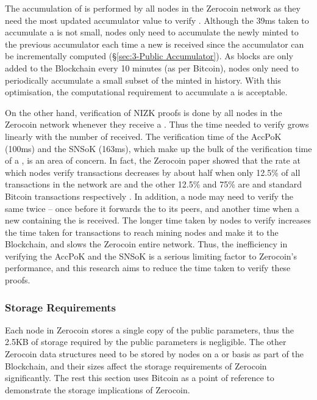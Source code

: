 The accumulation of  is performed by all nodes in the Zerocoin network as they need the most updated accumulator value to verify . Although the 39ms taken to accumulate a \kwCoin{} is not small, nodes only need to accumulate the newly minted  to the previous accumulator each time a new \kwBlock{} is received since the accumulator can be incrementally computed (\S\ref{sec:3-Public Accumulator}). As blocks are only added to the Blockchain every 10 minutes (as per Bitcoin), nodes only need to periodically accumulate a small subset of the minted  in history. With this optimisation, the computational requirement to accumulate a \kwCoin{} is acceptable. 

On the other hand, verification of NIZK proofs is done by all nodes in the Zerocoin network whenever they receive a . Thus the time needed to verify  grows linearly with the number of  received. The verification time of the AccPoK (100ms) and the SNSoK (163ms), which make up the bulk of the verification time of a , is an area of concern. In fact, the Zerocoin paper showed that the rate at which nodes verify transactions decreases by about half when only 12.5\% of all transactions in the network are  and the other 12.5\% and 75\% are  and standard Bitcoin transactions respectively \cite{Miers2013}. In addition, a node may need to verify the same  twice – once before it forwards the  to its peers, and another time when a new \kwBlock{} containing the  is received. The longer time taken by nodes to verify  increases the time taken for transactions to reach mining nodes and make it to the Blockchain, and slows the Zerocoin entire network. Thus, the inefficiency in verifying the AccPoK and the SNSoK is a serious limiting factor to Zerocoin’s performance, and this research aims to reduce the time taken to verify these proofs.

\subsubsection{Storage Requirements}
\label{sec:3-Storage Requirements}
Each node in Zerocoin stores a single copy of the public parameters, thus the 2.5KB of storage required by the public parameters is negligible. The other Zerocoin data structures need to be stored by nodes on a \kwTransaction{}{} or \kwBlock{} basis as part of the Blockchain, and their sizes affect the storage requirements of Zerocoin significantly. The rest this section uses Bitcoin as a point of reference to demonstrate the storage implications of Zerocoin.

